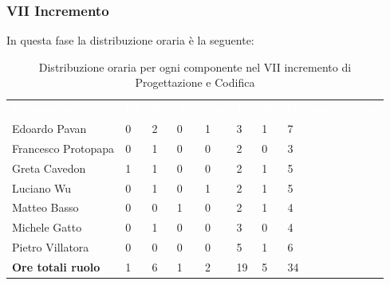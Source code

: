 \subsubsection{VII Incremento}
In questa fase la distribuzione oraria è la seguente:
\begin{table}[H]
\begin{center}
\renewcommand{\arraystretch}{1.25}
\begin{tabular}{ m{}<{\centering}  m{}<{\centering} m{}<{\centering} m{}<{\centering}  m{}<{\centering}  m{}<{\centering}  m{}<{\centering}  m{}<{\centering}   }
	\rowcolor{darkblue}
	\textcolor{white}{\textbf{Componente}} &\textcolor{white}{\textbf{Re}}&\textcolor{white}{\textbf{Pt}}&\textcolor{white}{\textbf{An}}&\textcolor{white}{\textbf{Am}}&\textcolor{white}{\textbf{Pr}}&\textcolor{white}{\textbf{Ve}}&\textcolor{white}{\textbf{Ore complessive}}\\ 
	Edoardo Pavan & 0 & 2 & 0 & 1 & 3 & 1 & 7 \\	
	
	Francesco Protopapa & 0 & 1 & 0 & 0 & 2 & 0 & 3 \\

	Greta Cavedon & 1 & 1 & 0 & 0 & 2 & 1 & 5 \\
	
	Luciano Wu & 0 & 1 & 0 & 1 & 2 & 1 & 5 \\
	
	Matteo Basso & 0 & 0 & 1 & 0 & 2 & 1 & 4 \\
	
	Michele Gatto & 0 & 1 & 0 & 0 & 3 & 0 & 4 \\
	
	Pietro Villatora & 0 & 0 & 0 & 0 & 5 & 1 & 6 \\
	
	\textbf{Ore totali ruolo} & 1 & 6 & 1 & 2 & 19 & 5 & 34 \\

\end{tabular}
\caption{Distribuzione oraria per ogni componente nel VII incremento di Progettazione e Codifica}
\end{center}
\end{table}

